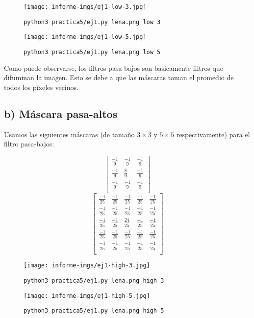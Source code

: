 \documentclass[11pt, spanish]{article}
\begin{document}
\begin{figure}[H]
\centering
  \texttt{[image: informe-imgs/ej1-low-3.jpg]}
  \caption{\texttt{python3 practica5/ej1.py lena.png low 3}}
\end{figure}

\begin{figure}[H]
\centering
  \texttt{[image: informe-imgs/ej1-low-5.jpg]}
  \caption{\texttt{python3 practica5/ej1.py lena.png low 5}}
\end{figure}

Como puede observarse, los filtros pasa bajos son basicamente filtros que difuminan la imagen.
Esto se debe a que las máscaras toman el promedio de todos los píxeles vecinos.

\subsection{b) Máscara pasa-altos}

Usamos las siguientes máscaras (de tamaño $3 \times 3$ y $5 \times 5$ respectivamente) para el filtro pasa-bajos:

\[
\begin{bmatrix}
\frac{-1}{9} & \frac{-1}{9} & \frac{-1}{9} \\
\frac{-1}{9} & \frac{8}{9} & \frac{-1}{9} \\
\frac{-1}{9} & \frac{-1}{9} & \frac{-1}{9} \\
\end{bmatrix}
\]
\[
\begin{bmatrix}
\frac{-1}{25} & \frac{-1}{25} & \frac{-1}{25} & \frac{-1}{25} & \frac{-1}{25} \\
\frac{-1}{25} & \frac{-1}{25} & \frac{-1}{25} & \frac{-1}{25} & \frac{-1}{25} \\
\frac{-1}{25} & \frac{-1}{25} & \frac{24}{25} & \frac{-1}{25} & \frac{-1}{25} \\
\frac{-1}{25} & \frac{-1}{25} & \frac{-1}{25} & \frac{-1}{25} & \frac{-1}{25} \\
\frac{-1}{25} & \frac{-1}{25} & \frac{-1}{25} & \frac{-1}{25} & \frac{-1}{25} \\
\end{bmatrix}
\]

\begin{figure}[H]
\centering
  \texttt{[image: informe-imgs/ej1-high-3.jpg]}
  \caption{\texttt{python3 practica5/ej1.py lena.png high 3}}
\end{figure}

\begin{figure}[H]
\centering
  \texttt{[image: informe-imgs/ej1-high-5.jpg]}
  \caption{\texttt{python3 practica5/ej1.py lena.png high 5}}
\end{figure}
\end{document}
